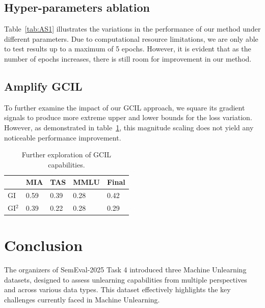 \documentclass[11pt]{article}
\begin{document}
\subsection{Hyper-parameters ablation}  

Table~\ref{tab:AS1} illustrates the variations in the performance of our method under different parameters. Due to computational resource limitations, we are only able to test results up to a maximum of 5 epochs. However, it is evident that as the number of epochs increases, there is still room for improvement in our method.

\subsection{Amplify GCIL} 
To further examine the impact of our GCIL approach, we square its gradient signals to produce more extreme upper and lower bounds for the loss variation. However, as demonstrated in table~\ref{tab:accents}, this magnitude scaling does not yield any noticeable performance improvement.

\begin{table}[h]\footnotesize
  \centering
    \begin{tabular}{l|l|l|l|l}
    \hline
        ~ & MIA & TAS & MMLU & Final \\ \hline
        GI & 0.59 & 0.39 & 0.28 & 0.42 \\ \hline
        GI$^2$ & 0.39 & 0.22 & 0.28 & 0.29 \\ \hline
    \end{tabular}
  \caption{Further exploration of GCIL capabilities.}
  \label{tab:accents}
\end{table}





\section{Conclusion} 
The organizers of SemEval-2025 Task 4 introduced three Machine Unlearning datasets, designed to assess unlearning capabilities from multiple perspectives and across various data types. This dataset effectively highlights the key challenges currently faced in Machine Unlearning.
\end{document}
